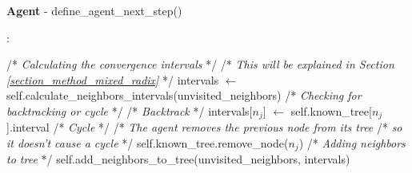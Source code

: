 \begin{algorithm}
\caption{\textbf{Agent} - define\_agent\_next\_step()}
\label{alg:define_agent_next_step}
\begin{algorithmic}
    :

        \State /* \textit{Calculating the convergence intervals} */
        \State /* \textit{This will be explained in Section \ref{section_method_mixed_radix}} */
        \State intervals $\gets$ self.calculate\_neighbors\_intervals(unvisited\_neighbors)
        \State
        \State /* \textit{Checking for backtracking or cycle} */
                    \State /* \textit{Backtrack} */
                    \State intervals[$n_{j}$] $\gets$ self.known\_tree[$n_{j}$].interval
                \Else
                    \State /* \textit{Cycle} */
                    \State /* \textit{The agent removes the previous node from its tree} 
                    \State /* \textit{so it doesn't cause a cycle} */
                    \State self.known\_tree.remove\_node($n_{j}$)
                \EndIf
            \EndIf
        \EndFor
        \State
        \State /* \textit{Adding neighbors to tree} */
        \State self.add\_neighbors\_to\_tree(unvisited\_neighbors, intervals)
\end{algorithmic}
\end{algorithm}
